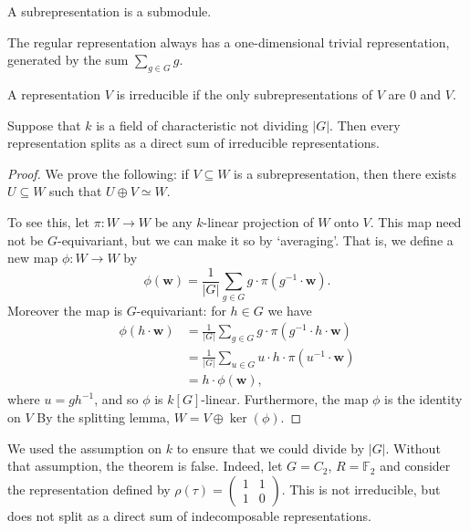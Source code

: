 \documentclass{willowtreebook}
\begin{document}
\begin{definition}
    A subrepresentation is a submodule. 
\end{definition}
\begin{example}
    The regular representation always has a one-dimensional trivial representation, generated by the sum $\sum_{g \in G}g$. 
\end{example}
\begin{definition}
    A representation $V$ is irreducible if the only subrepresentations of $V$ are $0$ and $V$. 
\end{definition}
\begin{theorem}[Maschke]Suppose that $k$ is a field of characteristic not dividing $|G|$. Then every
representation splits as a direct sum of irreducible representations.
\end{theorem}
\begin{proof}
    We prove the following: if $V \subseteq W$ is a subrepresentation, then there exists $U \subseteq W$ such that $U \oplus V \simeq W$. 

    To see this, let $\pi \colon W \to W$ be any $k$-linear projection of $W$ onto $V$. This map need not be $G$-equivariant, but we can make it so by `averaging'. That is, we define a new map $\phi \colon W \to W$ by 
    \[
\phi(\mathbf{w}) = \frac{1}{|G|}\sum_{g \in G}g \cdot \pi(g^{-1} \cdot \mathbf{w}). 
    \]
   Moreover the map is $G$-equivariant: for $h \in G$ we have
   \[
   \begin{split}
\phi(h \cdot \mathbf{w}) &= \frac{1}{|G|}\sum_{g \in G}g \cdot \pi(g^{-1} \cdot h \cdot \mathbf{w}) \\
& = \frac{1}{|G|}\sum_{u \in G}u \cdot h \cdot \pi(u^{-1} \cdot \mathbf{w}) \\
&= h \cdot \phi(\mathbf{w}),
\end{split}
   \]
   where $u = gh^{-1}$, and so $\phi$ is $k[G]$-linear. Furthermore, the map $\phi$ is the identity on $V$ By the splitting lemma, $W = V \oplus \ker(\phi)$. 
\end{proof}
\begin{remark}
We used the assumption on $k$ to ensure that we could divide by $|G|$. Without that assumption, the theorem is false. Indeed, let $G = C_2$, $R = \mathbb{F}_2$ and consider the representation defined by $\rho(\tau) =\begin{pmatrix}
1 & 1 \\
1 & 0 
\end{pmatrix} $. This is not irreducible, but does not split as a direct sum of indecomposable representations. 
\end{remark}
\end{document}
